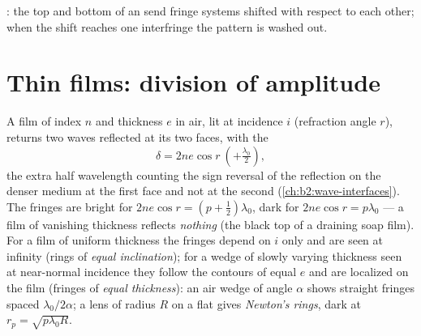 \begin{omfigure}

{\small {}: the top and bottom of an 
send fringe systems shifted with respect to each other; when the shift
reaches one interfringe the pattern is washed out.}
\end{omfigure}

\section{Thin films: division of amplitude}

\begin{proposition}\label{prop:b2:two-wave-interference:film}
A film of index $n$ and thickness $e$ in air, lit at incidence $i$
(refraction angle $r$), returns two waves reflected at its two faces,
with the 
\[
\delta = 2ne\cos r \ (+\tfrac{\lambda_0}2) ,
\]
the extra half wavelength counting the sign reversal of the reflection
on the denser medium at the first face and not at the second
(\cref{ch:b2:wave-interfaces}). The fringes are bright for $2ne\cos r =
(p + \tfrac12)\lambda_0$, dark for $2ne\cos r = p\lambda_0$ --- a film of vanishing
thickness reflects \emph{nothing} (the black top of a draining soap
film). For a film of uniform thickness the fringes depend on $i$ only
and are seen at infinity (rings of \emph{equal inclination}); for a
wedge of slowly varying thickness seen at near-normal incidence they
follow the contours of equal $e$ and are localized on the film
(fringes of \emph{equal thickness}): an air wedge of angle $\alpha$ shows
straight fringes spaced $\lambda_0/2\alpha$; a lens of radius $R$ on a flat gives
\emph{Newton's rings}, dark at $r_p = \sqrt{p\lambda_0R}$.
\end{proposition}

